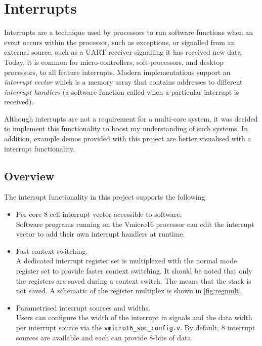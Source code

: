 \section{Interrupts}
\label{sect:interrupts}
Interrupts are a technique used by processors to run software functions when an event occurs within the processor, such as exceptions, or signalled from an external source, such as a UART receiver signalling it has received new data. Today, it is common for micro-controllers, soft-processors, and desktop processors, to all feature interrupts. Modern implementations support an \textit{interrupt vector} which is a memory array that contains addresses to different \textit{interrupt handlers} (a software function called when a particular interrupt is received).

Although interrupts are not a requirement for a multi-core system, it was decided to implement this functionality to boost my understanding of such systems. In addition, example demos provided with this project are better visualised with a interrupt functionality.

\subsection{Overview}
The interrupt functionality in this project supports the following:
\begin{itemize}
\item Per-core 8 cell interrupt vector accessible to software.\\
Software programs running on the Vmicro16 processor can edit the interrupt vector to add their own interrupt handlers at runtime.

\item Fast context switching.\\
A dedicated interrupt register set is multiplexed with the normal mode register set to provide faster context switching. It should be noted that only the registers are saved during a context switch. The means that the stack is not saved. A schematic of the register multiplex is shown in \cref{fig:regmult}.

\item Parametrised interrupt sources and widths.\\
Users can configure the width of the interrupt in signals and the data width per interrupt source via the \verb|vmicro16_soc_config.v|. By default, 8 interrupt sources are available and each can provide 8-bits of data.
\end{itemize}

